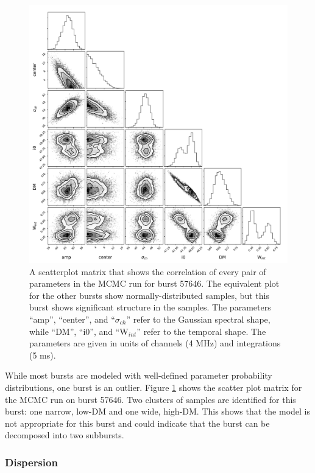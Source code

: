 \documentclass[twocolumn]{aastex61}
\begin{document}
\begin{figure}[htb]
\begin{center}
\includegraphics[width=2\columnwidth]{corner57646.pdf}
\caption{A scatterplot matrix that shows the correlation of every pair of parameters in the MCMC run for burst 57646. The equivalent plot for the other bursts show normally-distributed samples, but this burst shows significant structure in the samples. The parameters ``amp'', ``center'', and ``$\sigma_{ch}$'' refer to the Gaussian spectral shape, while ``DM'', ``i0'', and ``W$_{int}$'' refer to the temporal shape. The parameters are given in units of channels (4 MHz) and integrations (5 ms).
\label{fig:corner}}
\end{center}
\end{figure}

While most bursts are modeled with well-defined parameter probability distributions, one burst is an outlier. Figure \ref{fig:corner} shows the scatter plot matrix \citep{corner} for the MCMC run on burst 57646. Two clusters of samples are identified for this burst: one narrow, low-DM and one wide, high-DM. This shows that the model is not appropriate for this burst and could indicate that the burst can be decomposed into two subbursts.

\subsubsection{Dispersion}
\end{document}
